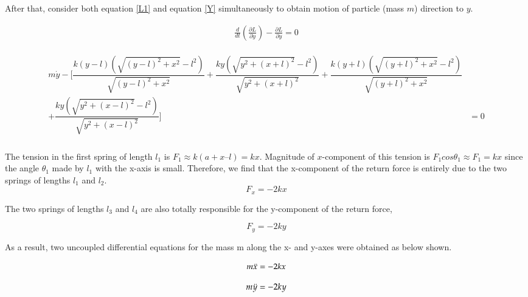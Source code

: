After that, consider both equation \eqref{L1} and equation \eqref{Y} simultaneously to obtain motion of particle (mass $m$) direction to $y$.

\begin{align*}
   \frac{d}{dt}(\frac{\partial L}{\partial \dot{y}})-\frac{\partial L}{\partial y} = 0
\end{align*}


\begin{align}
\label{Y1}
    \begin{split}
          m \Dot{y} - \bigg[ \dfrac{k\left(y-l\right)\left(\sqrt{\left(y-l\right)^2+x^2}-l^2\right)}{\sqrt{\left(y-l\right)^2+x^2}}  + \dfrac{ky\left(\sqrt{y^2+\left(x+l\right)^2}-l^2\right)}{\sqrt{y^2+\left(x+l\right)^2}} + \dfrac{k\left(y+l\right)\left(\sqrt{\left(y+l\right)^2+x^2}-l^2\right)}{\sqrt{\left(y+l\right)^2+x^2}}\\+ \dfrac{ky\left(\sqrt{y^2+\left(x-l\right)^2}-l^2\right)}{\sqrt{y^2+\left(x-l\right)^2}}
\bigg]& = 0   \\
    \end{split}
\end{align}

\newpage

The tension in the first spring of length $l_1$ is $F_1 \approx k (a+ x – l) = kx$. Magnitude of  $x$-component of this tension is $F_1 cosθ_1 \approx F_1 = kx$ since the angle $\theta_1$ made by $l_1$ with the x-axis is small. Therefore, we find that the x-component of the return force is entirely due to the two springs of lengths $l_1$ and $l_2$. 
\begin{equation}
    F_x = -2kx
\end{equation}

The two springs of lengths $l_3$ and $l_4$ are also totally responsible for the y-component of the return force,

\begin{equation}
     F_y = -2ky
\end{equation}

As a result,  two uncoupled differential equations for the mass m along the x- and y-axes were obtained as below shown.

\begin{equation}
    m\Ddot{x} = -2kx
\end{equation}

\begin{equation}
    m\Ddot{y} = -2ky
\end{equation}

